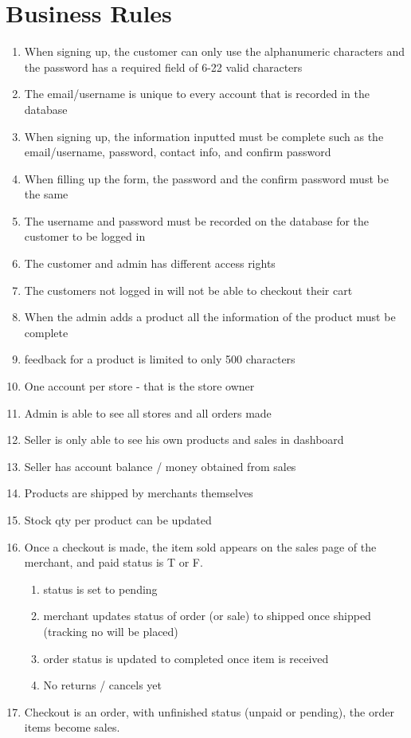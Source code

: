 \documentclass{report}
\begin{document}
\section{Business Rules}
\begin{enumerate}
\item When signing up, the customer can only use the alphanumeric characters and the password has a required field of 6-22 valid characters
\item The email/username is unique to every account that is recorded in the database
\item When signing up, the information inputted must be complete such as the email/username, password, contact info, and confirm password
\item When filling up the form, the password and the confirm password must be the same
\item The username and password must be recorded on the database for the customer to be logged in
\item The customer and admin has different access rights
\item The customers not logged in will not be able to checkout their cart
\item When the admin adds a product all the information of the product must be complete
\item feedback for a product is limited to only 500 characters
\item One account per store - that is the store owner
\item Admin is able to see all stores and all orders made
\item Seller is only able to see his own products and sales in dashboard 
\item Seller has account balance / money obtained from sales
\item Products are shipped by merchants themselves
\item Stock qty per product can be updated
\item Once a checkout is made, the item sold appears on the sales page of the merchant, and paid status is T or F. 
	\begin{enumerate}
	\item  status is set to pending
	\item merchant updates status of order (or sale) to shipped once shipped (tracking no will be placed) 
	\item order status is updated to completed once item is received
	\item No returns / cancels yet
	\end{enumerate}
\item Checkout is an order, with unfinished status (unpaid or pending), the order items become sales.
\end{enumerate}
\end{document}

